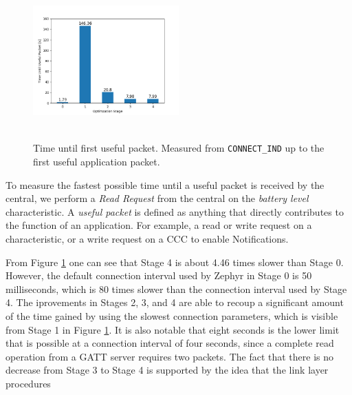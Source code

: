 \begin{figure}[]
    \centering
    \includegraphics[width=0.5\textwidth,height=6cm,keepaspectratio=true]{plots/static_useful_packet_time.png}
    \caption{
        Time until first useful packet. Measured from \texttt{CONNECT\_IND} up to the first useful application packet.
    }
    \label{fig:static_useful_packet_time}
\end{figure}

To measure the fastest possible time until a useful packet is received by the central, we perform a \textit{Read Request} from the central on the \textit{battery level} characteristic. A \textit{useful packet} is defined as anything that directly contributes to the function of an application. For example, a read or write request on a characteristic, or a write request on a CCC to enable Notifications. 

From Figure \ref{fig:static_useful_packet_time} one can see that Stage 4 is about 4.46 times slower than Stage 0. However, the default connection interval used by Zephyr in Stage 0 is 50 milliseconds, which is 80 times slower than the connection interval used by Stage 4. The iprovements in Stages 2, 3, and 4 are able to recoup a significant amount of the time gained by using the slowest connection parameters, which is visible from Stage 1 in Figure \ref{fig:static_useful_packet_time}. It is also notable that eight seconds is the lower limit that is possible at a connection interval of four seconds, since a complete read operation from a GATT server requires two packets. The fact that there is no decrease from Stage 3 to Stage 4 is supported by the idea that the link layer procedures 

